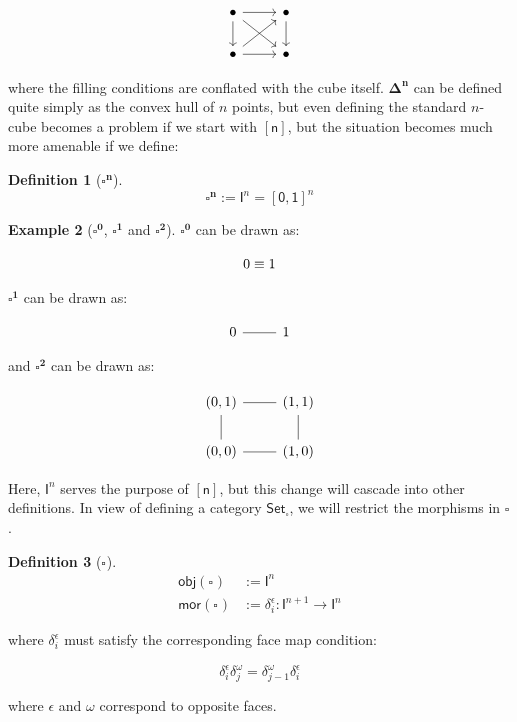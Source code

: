 \documentclass[10pt]{amsart}
\newcommand{\obj}{\ensuremath{\mathsf{obj}}}
\newcommand{\mor}{\ensuremath{\mathsf{mor}}}
\newcommand{\Simplex}[1]{\ensuremath{\boldsymbol{\Delta^{#1}}}}
\newcommand{\sq}[1]{\ensuremath{\mathsf{[#1]}}}
\newcommand{\Cube}[1]{\ensuremath{\boldsymbol{\square^{#1}}}}
\newcommand{\I}[1]{\ensuremath{\mathsf{I}^{#1}}}
\newcommand{\CSet}{\ensuremath{\mathsf{Set}_{\boldsymbol{\square}}}}
\theoremstyle{definition}
\newtheorem{definition}{Definition}[section]
\newtheorem{example}[definition]{Example}
\numberwithin{definition}{subsection}
\numberwithin{definition}{section}
\begin{document}
$$
  \begin{tikzcd}
    \bullet \arrow[r] \arrow[dr] \arrow[d] & \bullet \arrow[d] \\
    \bullet \arrow[r] \arrow[ur] & \bullet
  \end{tikzcd}
$$

where the filling conditions are conflated with the cube itself. $\Simplex{n}$ can be defined quite simply as the convex hull of $n$ points, but even defining the standard $n$-cube becomes a problem if we start with $\sq{n}$, but the situation becomes much more amenable if we define:

\begin{definition}[\Cube{n}]
  \begin{equation*}
    \Cube{n} := \I{n} = \sq{0, 1}^n
  \end{equation*}
\end{definition}

\begin{example}[$\Cube{0}$, $\Cube{1}$ and $\Cube{2}$]
  $\Cube{0}$ can be drawn as:

  $$
    \begin{tikzcd}
      0 \equiv 1
    \end{tikzcd}
  $$

  $\Cube{1}$ can be drawn as:

  $$
    \begin{tikzcd}
      0 \arrow[r, dash] & 1
    \end{tikzcd}
  $$

  and $\Cube{2}$ can be drawn as:

  $$
    \begin{tikzcd}
      (0, 1) \arrow[r, dash] & (1, 1) \arrow[d, dash] \\
      (0, 0) \arrow[u, dash] & (1, 0) \arrow[l, dash]
    \end{tikzcd}
  $$
\end{example}

Here, $\I{n}$ serves the purpose of \sq{n}, but this change will cascade into other definitions. In view of defining a category \CSet, we will restrict the morphisms in \Cube{}.

\begin{definition}[\Cube{}]
  \begin{align*}
    \obj(\Cube{}) & := \I{n}                                           \\
    \mor(\Cube{}) & := \delta^\epsilon_i : \I{n + 1} \rightarrow \I{n}
  \end{align*}

  where $\delta^\epsilon_i$ must satisfy the corresponding face map condition:

  \begin{equation*}
    \delta^\epsilon_i \delta^\omega_j = \delta^\omega_{j - 1} \delta^\epsilon_i
  \end{equation*}

  where $\epsilon$ and $\omega$ correspond to opposite faces.
\end{definition}
\end{document}
